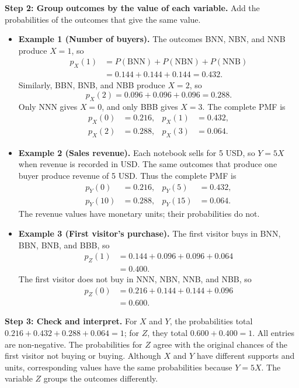 \textbf{Step 2: Group outcomes by the value of each variable.} Add the probabilities of the outcomes that give the same value.

\begin{itemize}
	\item \textbf{Example 1 (Number of buyers).}
	The outcomes BNN, NBN, and NNB produce $X=1$, so
	\[
	\begin{aligned}
		p_X(1)
		&=P(\mathrm{BNN})+P(\mathrm{NBN})+P(\mathrm{NNB})\\
		&=0.144+0.144+0.144=0.432.
	\end{aligned}
	\]
	Similarly, BBN, BNB, and NBB produce $X=2$, so
	\[
	p_X(2)=0.096+0.096+0.096=0.288.
	\]
	Only NNN gives $X=0$, and only BBB gives $X=3$.
	The complete PMF is
	\[
	\begin{aligned}
		p_X(0)&=0.216, & p_X(1)&=0.432,\\
		p_X(2)&=0.288, & p_X(3)&=0.064.
	\end{aligned}
	\]
	
	\item \textbf{Example 2 (Sales revenue).}
	Each notebook sells for 5 USD, so $Y=5X$ when revenue
	is recorded in USD. The same outcomes that produce one
	buyer produce revenue of 5 USD. Thus the complete PMF is
	\[
	\begin{aligned}
		p_Y(0)&=0.216, & p_Y(5)&=0.432,\\
		p_Y(10)&=0.288, & p_Y(15)&=0.064.
	\end{aligned}
	\]
	The revenue values have monetary units; their
	probabilities do not.
	
	\item \textbf{Example 3 (First visitor's purchase).}
	The first visitor buys in BNN, BBN, BNB, and BBB, so
	\[
	\begin{aligned}
		p_Z(1)
		&=0.144+0.096+0.096+0.064\\
		&=0.400.
	\end{aligned}
	\]
	The first visitor does not buy in NNN, NBN, NNB,
	and NBB, so
	\[
	\begin{aligned}
		p_Z(0)
		&=0.216+0.144+0.144+0.096\\
		&=0.600.
	\end{aligned}
	\]
\end{itemize}

\textbf{Step 3: Check and interpret.} For $X$ and $Y$, the probabilities total $0.216+0.432+0.288+0.064=1$; for $Z$, they total $0.600+0.400=1$. All entries are non-negative. The probabilities for $Z$ agree with the original chances of the first visitor not buying or buying. Although $X$ and $Y$ have different supports and units, corresponding values have the same probabilities because $Y=5X$. The variable $Z$ groups the outcomes differently.


